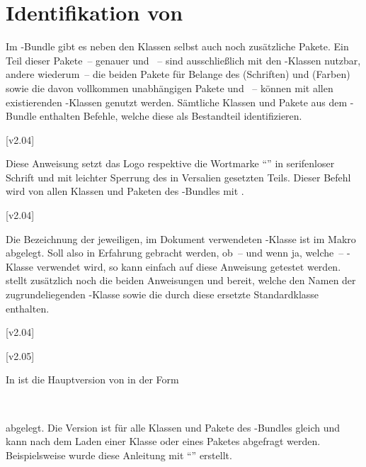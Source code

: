 \section{Identifikation von \TUDScript}

\begin{Entity}{}
Im \TUDScript-Bundle gibt es neben den Klassen selbst auch noch zusätzliche 
Pakete. Ein Teil dieser Pakete~-- genauer  und 
~-- sind ausschließlich mit den \TUDScript-Klassen nutzbar,
andere wiederum~-- die beiden Pakete für Belange des \CDs {}
(Schriften) und  (Farben) sowie die davon vollkommen 
unabhängigen Pakete  und ~-- können mit 
allen existierenden -Klassen genutzt werden. Sämtliche 
Klassen und Pakete aus dem \TUDScript-Bundle enthalten Befehle, welche diese 
als Bestandteil identifizieren.

\begin{Declaration}
  {}
  [v2.04]
\printdeclarationlist

Diese Anweisung setzt das Logo respektive die Wortmarke \enquote{\TUDScript{}} 
in serifenloser Schrift und mit leichter Sperrung des in Versalien gesetzten 
Teils. Dieser Befehl wird von allen Klassen und Paketen des \TUDScript-Bundles 
mit .
\end{Declaration}

\begin{Declaration}
  {}
  [v2.04]
\printdeclarationlist

Die Bezeichnung der jeweiligen, im Dokument verwendeten \TUDScript-Klasse ist 
im Makro  abgelegt. Soll also in Erfahrung gebracht 
werden, ob~-- und wenn ja, welche~-- \TUDScript-Klasse verwendet wird, so kann 
einfach auf diese Anweisung getestet werden. \KOMAScript{} stellt zusätzlich 
noch die beiden Anweisungen  und  
bereit, welche den Namen der zugrundeliegenden \KOMAScript-Klasse sowie die 
durch diese ersetzte Standardklasse enthalten.
\end{Declaration}

\begin{Declaration}
  {}
  [v2.04]
\begin{Declaration}
  {}
  [v2.05]
\printdeclarationlist

In  ist die Hauptversion von \TUDScript in der Form
\begin{quoting}
~~
\end{quoting}
abgelegt. Die Version ist für alle Klassen und Pakete des \TUDScript-Bundles
gleich und kann nach dem Laden einer Klasse oder eines Paketes abgefragt 
werden. Beispielsweise wurde diese Anleitung mit \enquote{\TUDScriptVersion{}} 
erstellt.


\end{Declaration}
\end{Declaration}
\end{Entity}
